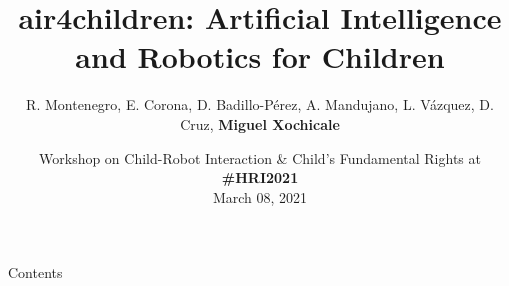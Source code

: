 \documentclass[xcolor={dvipsnames},aspectratio=169,10pt]{beamer}
\title{air4children: Artificial Intelligence and Robotics for Children}
\author{
R. Montenegro,
E. Corona,
D. Badillo-P\'erez,
A. Mandujano,
L. V\'azquez,
D. Cruz,
{\bf Miguel Xochicale}
}
\date{
Workshop on Child-Robot Interaction \& Child's Fundamental Rights at {\bf \#HRI2021} \\
March 08, 2021
}
\institute{
	\faEnvelope   air4children@gmail.com \\
	\faGithubAlt @air4children \faTwitter @air4children  
		}
\begin{document}
\maketitle

\begin{frame}{Contents}
    \tableofcontents
\end{frame}







\maketitle
\end{document}
